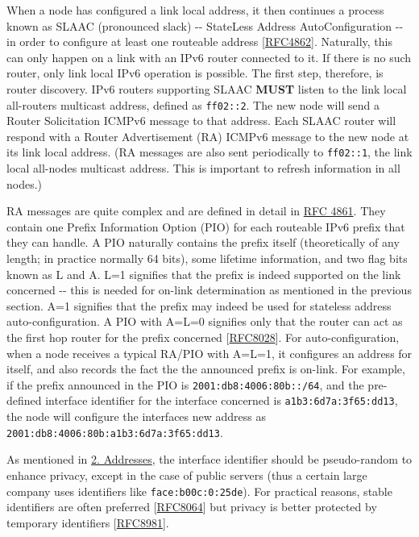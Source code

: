 \documentclass[
]{article}
\begin{document}
When a node has configured a link local address, it then continues a
process known as SLAAC (pronounced
\textquotesingle slack\textquotesingle) -\/- StateLess Address
AutoConfiguration -\/- in order to configure at least one routeable
address {[}\href{https://www.rfc-editor.org/info/rfc4862}{RFC4862}{]}.
Naturally, this can only happen on a link with an IPv6 router connected
to it. If there is no such router, only link local IPv6 operation is
possible. The first step, therefore, is router discovery. IPv6 routers
supporting SLAAC \textbf{MUST} listen to the link local all-routers
multicast address, defined as \texttt{ff02::2}. The new node will send a
Router Solicitation ICMPv6 message to that address. Each SLAAC router
will respond with a Router Advertisement (RA) ICMPv6 message to the new
node at its link local address. (RA messages are also sent periodically
to \texttt{ff02::1}, the link local all-nodes multicast address. This is
important to refresh information in all nodes.)

RA messages are quite complex and are defined in detail in
\href{https://www.rfc-editor.org/info/rfc4861}{RFC 4861}. They contain
one Prefix Information Option (PIO) for each routeable IPv6 prefix that
they can handle. A PIO naturally contains the prefix itself
(theoretically of any length; in practice normally 64 bits), some
lifetime information, and two flag bits known as L and A. L=1 signifies
that the prefix is indeed supported on the link concerned -\/- this is
needed for on-link determination as mentioned in the previous section.
A=1 signifies that the prefix may indeed be used for stateless address
auto-configuration. A PIO with A=L=0 signifies only that the router can
act as the first hop router for the prefix concerned
{[}\href{https://www.rfc-editor.org/info/rfc8028}{RFC8028}{]}. For
auto-configuration, when a node receives a typical RA/PIO with A=L=1, it
configures an address for itself, and also records the fact the the
announced prefix is on-link. For example, if the prefix announced in the
PIO is \texttt{2001:db8:4006:80b::/64}, and the pre-defined interface
identifier for the interface concerned is \texttt{a1b3:6d7a:3f65:dd13},
the node will configure the interface\textquotesingle s new address as
\texttt{2001:db8:4006:80b:a1b3:6d7a:3f65:dd13}.

As mentioned in \hyperref[addresses]{2. Addresses}, the interface
identifier should be pseudo-random to enhance privacy, except in the
case of public servers (thus a certain large company uses identifiers
like \texttt{face:b00c:0:25de}). For practical reasons, stable
identifiers are often preferred
{[}\href{https://www.rfc-editor.org/info/rfc8064}{RFC8064}{]} but
privacy is better protected by temporary identifiers
{[}\href{https://www.rfc-editor.org/info/rfc8981}{RFC8981}{]}.
\end{document}
